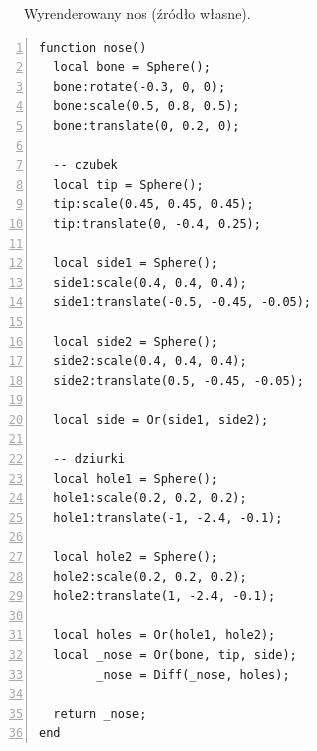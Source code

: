 \begin{figure}[h!]
  \centering
  \qquad
  \qquad
  \caption{Wyrenderowany nos (źródło własne).}
\end{figure}

{
\small
\begin{lstlisting}[numbers=left,frame=single,numberstyle=\tiny,backgroundcolor=\color{code_back},breaklines=true]
function nose()
  local bone = Sphere();
  bone:rotate(-0.3, 0, 0);
  bone:scale(0.5, 0.8, 0.5);
  bone:translate(0, 0.2, 0);

  -- czubek
  local tip = Sphere();
  tip:scale(0.45, 0.45, 0.45);
  tip:translate(0, -0.4, 0.25);

  local side1 = Sphere();
  side1:scale(0.4, 0.4, 0.4);
  side1:translate(-0.5, -0.45, -0.05);

  local side2 = Sphere();
  side2:scale(0.4, 0.4, 0.4);
  side2:translate(0.5, -0.45, -0.05);

  local side = Or(side1, side2);

  -- dziurki
  local hole1 = Sphere();
  hole1:scale(0.2, 0.2, 0.2);
  hole1:translate(-1, -2.4, -0.1);

  local hole2 = Sphere();
  hole2:scale(0.2, 0.2, 0.2);
  hole2:translate(1, -2.4, -0.1);

  local holes = Or(hole1, hole2);
  local _nose = Or(bone, tip, side);
        _nose = Diff(_nose, holes);

  return _nose;
end
\end{lstlisting}
}

